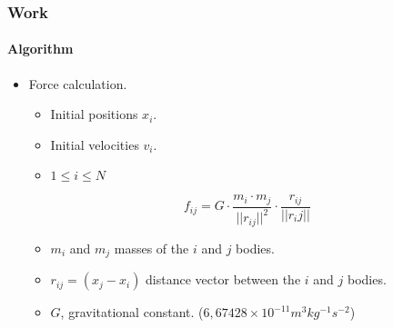 \frame
{
\frametitle{Work}
\framesubtitle{Algorithm}

\begin{itemize}
    \item Force calculation.
    \begin{itemize}
        \item Initial positions $x_i$.
        \item Initial velocities $v_i$.
        \item $1 \leq i \leq N$
    \end{itemize}
    $$f_{ij} =G \cdot \frac{m_i \cdot m_j}{||r_{ij}||^{2}} \cdot \frac{r_{ij}}{||r_ij||}$$
    \begin{itemize}
        \item $m_i$ and $m_j$ masses of the $i$ and $j$ bodies.
        \item $r_{ij} = (x_j - x_i )$ distance vector between the $i$ and $j$ bodies.
        \item $G$, gravitational constant. ($6,67428 \times 10^{-11} m^{3} kg^{-1} s^{-2}$)
    \end{itemize}
\end{itemize}
}
